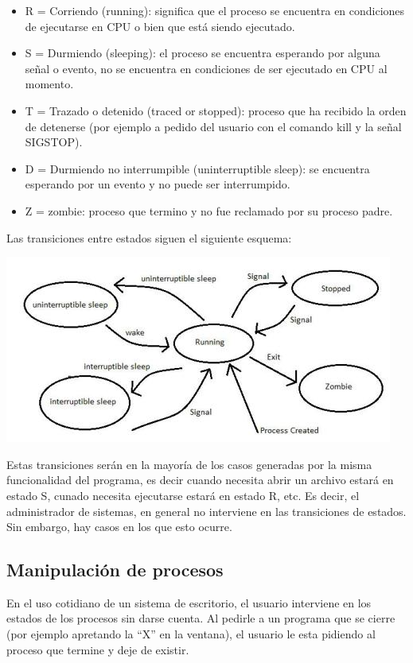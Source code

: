 \documentclass[12pt]{article}
\begin{document}
\begin{itemize}
\item R = Corriendo (running): significa que el proceso se encuentra en 
condiciones de ejecutarse en CPU o bien que está siendo ejecutado.  
\item S = Durmiendo (sleeping): el proceso se encuentra esperando por 
alguna señal o evento, no se encuentra en condiciones de ser ejecutado en 
CPU al momento. 
\item T = Trazado o detenido (traced or stopped): proceso que ha recibido 
la orden de detenerse (por ejemplo a pedido del usuario con el comando 
kill y la señal SIGSTOP). 
\item D = Durmiendo no interrumpible (uninterruptible sleep): se encuentra
esperando por un evento y no puede ser interrumpido. 
\item Z = zombie: proceso que termino y no fue reclamado por su proceso 
padre. 
\end{itemize}

Las transiciones entre estados siguen el siguiente esquema: 

\begin{center}
\includegraphics{process-states-s.jpg}
\end{center}
 
Estas transiciones serán en la mayoría de los casos generadas por la misma
funcionalidad del programa, es decir cuando necesita abrir un archivo
estará en estado S, cunado necesita ejecutarse estará en estado R, etc. 
Es decir, el administrador de sistemas, en general no interviene en las
transiciones de estados. Sin embargo, hay casos en los que esto ocurre. 

\subsection*{Manipulación de procesos}

En el uso cotidiano de un sistema de escritorio, el usuario interviene 
en los estados de los procesos sin darse cuenta. Al pedirle a un programa
que se cierre (por ejemplo apretando la ``X'' en la ventana), el usuario
le esta pidiendo al proceso que termine y deje de existir. 
\end{document}
